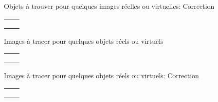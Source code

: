 \documentclass{article}
\newcommand{\titre}[1]{\hfil{\Large #1}}
\begin{document}
\titre{Objets \`a trouver pour quelques images r\'eelles ou virtuelles: Correction}
\begin{tabular}{|c|c|}
\hline
&\\ \hline
&\\ \hline
&\\ \hline
&\\ \hline
\end{tabular}


\newpage
\setcounter{page}{1}
\titre{Images \`a tracer pour quelques objets r\'eels ou virtuels}
\begin{tabular}{|c|c|}
\hline
&\\ \hline
&\\ \hline
&\\ \hline
&\\ \hline
\end{tabular}


\newpage


\titre{Images \`a tracer pour quelques objets r\'eels ou virtuels: Correction}
\begin{tabular}{|c|c|}
\hline
&\\ \hline
&\\ \hline
&\\ \hline
&\\ \hline
\end{tabular}


\newpage
\end{document}
